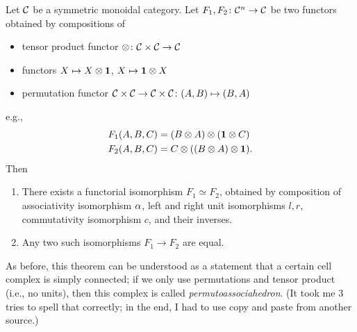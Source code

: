\begin{theorem}\label{t:maclane-symmetric}\par

  \noindent
  Let $\mathcal{C}$ be a symmetric monoidal category. Let $F_1, F_2\colon \mathcal{C}^n\to
  \mathcal{C}$ be two functors obtained by compositions of
  \begin{itemize}
    \item tensor product functor $\otimes\colon \mathcal{C}\times \mathcal{C}\to \mathcal{C}$
    \item functors $X\mapsto X\otimes \mathbf{1}$, $X\mapsto \mathbf{1} \otimes X$
    \item permutation functor $\mathcal{C}\times \mathcal{C} \to \mathcal{C}\times \mathcal{C}
          \colon (A, B)\mapsto (B,A)$
  \end{itemize}
  e.g.,
  \begin{align*}
    F_1(A,B,C)&=(B\otimes A)\otimes (\mathbf{1}\otimes C)\\
    F_2(A,B,C)&=C\otimes ((B\otimes  A)\otimes \mathbf{1}).
  \end{align*}
  Then
  \begin{enumerate}
    \item There exists a functorial isomorphism $F_1\simeq F_2$, obtained
      by composition of associativity isomorphism $\alpha$, left and right
      unit isomorphisms $l,r$, commutativity isomorphism $c$, and their
      inverses.
    \item Any two such isomorphisms $F_1\to F_2$ are equal.
  \end{enumerate}
\end{theorem}
As before, this theorem can be understood as a statement that a certain cell
complex is simply connected; if we only use permutations and tensor product
(i.e., no units), then this complex is called \emph{permutoassociahedron}. (It
took me 3 tries to spell that correctly; in the end, I had to use copy and
paste from another source.)

\clearpage
